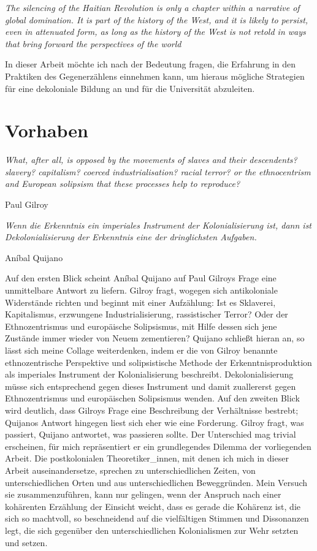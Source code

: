 \begin{myenv}

  \textit{ \glqq The silencing of the Haitian Revolution is only a chapter within
    a narrative of global domination. It is part of the history of the West, and
    it is likely to persist, even in attenuated form, as long as the history of
    the West is not retold in ways that bring forward the perspectives of the
world \grqq \footnotemark {} } \end{myenv}

In dieser Arbeit möchte ich nach der Bedeutung fragen, die Erfahrung in den
Praktiken des Gegenerzählens einnehmen kann, um hieraus mögliche Strategien
für eine dekoloniale Bildung an und für die Universität abzuleiten.
\section{Vorhaben}
\epigraph{\textit{What, after all, is opposed by the movements of slaves and their descendents?
slavery? capitalism? coerced industrialisation? racial terror?
or the ethnocentrism and European solipsism that these processes help to
reproduce?}}{Paul Gilroy \footnotemark} 

\epigraph{\textit{Wenn die Erkenntnis ein imperiales Instrument der
Kolonialisierung ist, dann ist Dekolonialisierung der Erkenntnis eine der
dringlichsten Aufgaben.}}{Aníbal Quijano \footnotemark} 
Auf den ersten Blick scheint Aníbal Quijano auf Paul Gilroys Frage eine
unmittelbare Antwort zu liefern. Gilroy fragt, wogegen sich antikoloniale
Widerstände richten und beginnt mit einer Aufzählung: Ist es Sklaverei,
Kapitalismus, erzwungene Industrialisierung, rassistischer Terror? Oder der
Ethnozentrismus und europäische Solipsismus, mit Hilfe dessen sich jene Zustände
immer wieder von Neuem zementieren? Quijano schließt hieran an, so lässt sich
meine Collage weiterdenken, indem er die von Gilroy benannte ethnozentrische
Perspektive und solipsistische Methode der Erkenntnisproduktion als imperiales
Instrument der Kolonialisierung beschreibt. Dekolonialisierung müsse sich
entsprechend gegen dieses Instrument und damit zuallererst gegen Ethnozentrismus
und europäischen Solipsismus wenden.  Auf den zweiten Blick wird deutlich, dass
Gilroys Frage eine Beschreibung der Verhältnisse bestrebt; Quijanos Antwort
hingegen liest sich eher wie eine Forderung. Gilroy fragt, was passiert, Quijano
antwortet, was passieren sollte.  Der Unterschied mag trivial erscheinen, für
mich repräsentiert er ein grundlegendes Dilemma der vorliegenden Arbeit. Die
postkolonialen Theoretiker\_innen, mit denen ich mich in dieser Arbeit
auseinandersetze, sprechen zu unterschiedlichen Zeiten, von unterschiedlichen
Orten und aus unterschiedlichen Beweggründen. Mein Versuch sie zusammenzuführen,
kann nur gelingen, wenn der Anspruch nach einer kohärenten Erzählung der
Einsicht weicht, dass es gerade die Kohärenz ist, die sich so machtvoll, so
beschneidend auf die vielfältigen Stimmen und Dissonanzen legt, die sich
gegenüber den unterschiedlichen Kolonialismen zur Wehr setzten und setzen.
